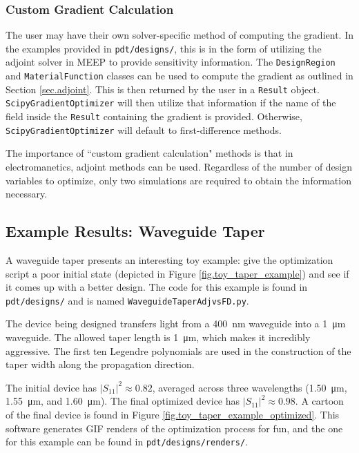 \documentclass[12pt]{article}
\begin{document}
\subsubsection{Custom Gradient Calculation}
The user may have their own solver-specific method of computing the gradient. In the examples provided in \texttt{pdt/designs/}, this is in the form of utilizing the adjoint solver in MEEP to provide sensitivity information. The \texttt{DesignRegion} and \texttt{MaterialFunction} classes can be used to compute the gradient as outlined in Section \ref{sec.adjoint}. This is then returned by the user in a \texttt{Result} object. \texttt{ScipyGradientOptimizer} will then utilize that information if the name of the field inside the \texttt{Result} containing the gradient is provided. Otherwise, \texttt{ScipyGradientOptimizer} will default to first-difference methods.

The importance of ``custom gradient calculation" methods is that in electromanetics, adjoint methods can be used. Regardless of the number of design variables to optimize, only two simulations are required to obtain the information necessary.

\subsection{Example Results: Waveguide Taper}
A waveguide taper presents an interesting toy example: give the optimization script a poor initial state (depicted in Figure \ref{fig.toy_taper_example}) and see if it comes up with a better design. The code for this example is found in \texttt{pdt/designs/} and is named \texttt{WaveguideTaperAdjvsFD.py}.

The device being designed transfers light from a \SI{400}{\nano\meter} waveguide into a \SI{1}{\micro\meter} waveguide. The allowed taper length is \SI{1}{\micro\meter}, which makes it incredibly aggressive. The first ten Legendre polynomials are used in the construction of the taper width along the propagation direction.

The initial device has $\left|S_{11}\right|^2 \approx 0.82$, averaged across three wavelengths (\SI{1.50}{\micro\meter}, \SI{1.55}{\micro\meter}, and \SI{1.60}{\micro\meter}). The final optimized device has $\left|S_{11}\right|^2 \approx 0.98$. A cartoon of the final device is found in Figure \ref{fig.toy_taper_example_optimized}. This software generates GIF renders of the optimization process for fun, and the one for this example can be found in \texttt{pdt/designs/renders/}.
\end{document}
